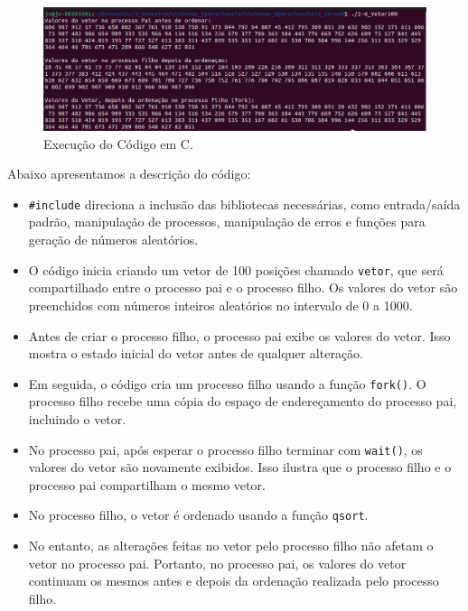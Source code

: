 \documentclass[
	12pt,				%
	openright,			%
	oneside,			%
	a4paper,			%
	chapter=TITLE,		%
	english,			%
	french,				%
	spanish,			%
	brazil				%
	]{abntex2}
\theoremstyle{definition}
\begin{document}
\begin{figure}
    \centering
    \includegraphics[width=1.0 \textwidth]{imagens/run_processos_6.png}
    \caption{Execução do Código em C.}
    \label{fig:run6}
\end{figure}

Abaixo apresentamos a descrição do código: 

\begin{itemize}
        \item \texttt{\#include} direciona a inclusão das bibliotecas necessárias, como entrada/saída padrão, manipulação de processos, manipulação de erros e funções para geração de números aleatórios.
    
        \item O código inicia criando um vetor de 100 posições chamado \texttt{vetor}, que será compartilhado entre o processo pai e o processo filho. Os valores do vetor são preenchidos com números inteiros aleatórios no intervalo de 0 a 1000.
    
        \item Antes de criar o processo filho, o processo pai exibe os valores do vetor. Isso mostra o estado inicial do vetor antes de qualquer alteração.
    
        \item Em seguida, o código cria um processo filho usando a função \texttt{fork()}. O processo filho recebe uma cópia do espaço de endereçamento do processo pai, incluindo o vetor.
    
        \item No processo pai, após esperar o processo filho terminar com \texttt{wait()}, os valores do vetor são novamente exibidos. Isso ilustra que o processo filho e o processo pai compartilham o mesmo vetor.
    
        \item No processo filho, o vetor é ordenado usando a função \texttt{qsort}.
    
        \item No entanto, as alterações feitas no vetor pelo processo filho não afetam o vetor no processo pai. 
    Portanto, no processo pai, os valores do vetor continuam os mesmos antes e depois da ordenação realizada pelo processo filho.
\end{itemize}
\end{document}
